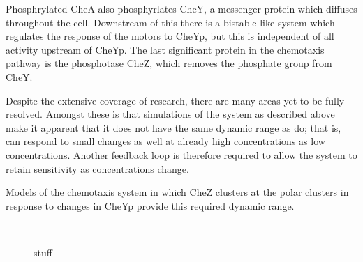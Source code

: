 \documentclass[../main.tex]{subfiles}
\begin{document}
Phosphrylated CheA also phosphyrlates CheY, a messenger protein which diffuses throughout the cell. Downstream of this there is a bistable-like system which regulates the response of the motors to CheYp, but this is independent of all activity upstream of CheYp. The last significant protein in the \ecoli chemotaxis pathway is the phosphotase CheZ, which removes the phosphate group from CheY.

Despite the extensive coverage of research, there are many areas yet to be fully resolved. Amongst these is that simulations of the system as described above make it apparent that it does not have the same dynamic range as \ecoli do; that is, \ecoli can respond to small changes as well at already high concentrations as low concentrations. Another feedback loop is therefore required to allow the system to retain sensitivity as concentrations change.

Models of the chemotaxis system in which CheZ clusters at the polar clusters in response to changes in CheYp provide this required dynamic range.

\begin{figure}
\begin{center}
\\
\caption{stuff}
\end{center}
\end{figure}
\end{document}
